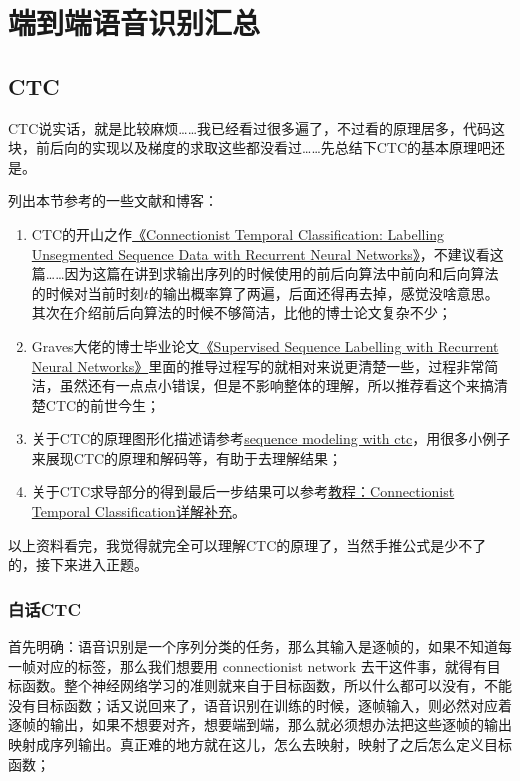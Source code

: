 \chapter{端到端语音识别汇总}
\section{CTC}
CTC说实话，就是比较麻烦……我已经看过很多遍了，不过看的原理居多，代码这块，前后向的实现以及梯度的求取这些都没看过……先总结下CTC的基本原理吧还是。

列出本节参考的一些文献和博客：
\begin{enumerate}
  \item CTC的开山之作\href{http://www.cs.toronto.edu/~graves/icml_2006.pdf}{《Connectionist Temporal Classification: Labelling Unsegmented Sequence Data with Recurrent Neural Networks》}，不建议看这篇……因为这篇在讲到求输出序列的时候使用的前后向算法中前向和后向算法的时候对当前时刻$t$的输出概率算了两遍，后面还得再去掉，感觉没啥意思。其次在介绍前后向算法的时候不够简洁，比他的博士论文复杂不少；
  \item Graves大佬的博士毕业论文\href{https://www.cs.toronto.edu/~graves/preprint.pdf}{《Supervised Sequence Labelling with Recurrent Neural Networks》}里面的推导过程写的就相对来说更清楚一些，过程非常简洁，虽然还有一点点小错误，但是不影响整体的理解，所以推荐看这个来搞清楚CTC的前世今生；
  \item 关于CTC的原理图形化描述请参考\href{https://distill.pub/2017/ctc/}{sequence modeling with ctc}，用很多小例子来展现CTC的原理和解码等，有助于去理解结果；
  \item 关于CTC求导部分的得到最后一步结果可以参考\href{https://blog.csdn.net/w5688414/article/details/77867786}{教程：Connectionist Temporal Classification详解补充}。
\end{enumerate}

以上资料看完，我觉得就完全可以理解CTC的原理了，当然手推公式是少不了的，接下来进入正题。
\subsection{白话CTC}
首先明确：语音识别是一个序列分类的任务，那么其输入是逐帧的，如果不知道每一帧对应的标签，那么我们想要用 connectionist network 去干这件事，就得有目标函数。整个神经网络学习的准则就来自于目标函数，所以什么都可以没有，不能没有目标函数；话又说回来了，语音识别在训练的时候，逐帧输入，则必然对应着逐帧的输出，如果不想要对齐，想要端到端，那么就必须想办法把这些逐帧的输出映射成序列输出。真正难的地方就在这儿，怎么去映射，映射了之后怎么定义目标函数；

